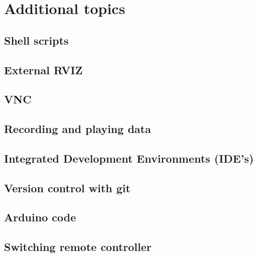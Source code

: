 %
%


\chapter{Additional topics}
\label{sec:advanced}


\section{Shell scripts}
\label{sec:advanced_shell_scripts}

\section{External RVIZ}
\label{sec:advanced_rviz_ext}

\section{VNC}
\label{sec:advanced_vnc}

\section{Recording and playing data}
\label{sec:advanced_rosbag}

\section{Integrated Development Environments (IDE's)}
\label{sec:advanced_ide}

\section{Version control with git}
\label{sec:advanced_git}

\section{Arduino code}
\label{sec:advanced_ide}

\section{Switching remote controller}
\label{sec:advanced_switch}